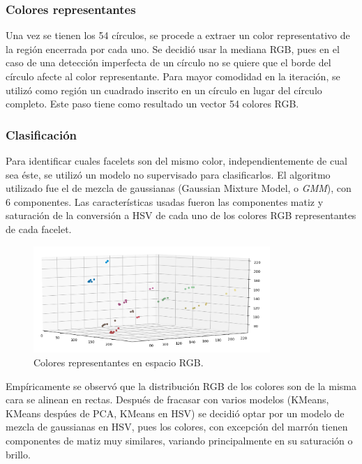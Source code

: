 \subsubsection{Colores representantes}
Una vez se tienen los 54 círculos, se procede a extraer un color representativo de la región encerrada por cada uno. Se decidió usar la mediana RGB, pues en el caso de una detección imperfecta de un círculo no se quiere que el borde del círculo afecte al color representante. Para mayor comodidad en la iteración, se utilizó como región un cuadrado inscrito en un círculo en lugar del círculo completo. Este paso tiene como resultado un vector 54 colores RGB.

\subsubsection{Clasificación}
Para identificar cuales facelets son del mismo color, independientemente de cual sea éste, se utilizó un modelo no supervisado para clasificarlos. El algoritmo utilizado fue el de mezcla de gaussianas (Gaussian Mixture Model, o \textit{GMM}), con 6 componentes. Las características usadas fueron las componentes matiz y saturación de la conversión a HSV de cada uno de los colores RGB representantes de cada facelet.

\begin{figure}[h!]
	\centering
	\includegraphics[width=0.8\textwidth]{figures/rgb_3d}
	\caption{Colores representantes en espacio RGB.}
	\label{rgb3d}
\end{figure}


Empíricamente se observó que la distribución RGB de los colores son de la misma cara se alinean en rectas. Después de fracasar con varios modelos (KMeans, KMeans despúes de PCA, KMeans en HSV) se decidió optar por un modelo de mezcla de gaussianas en HSV, pues los colores, con excepción del marrón tienen componentes de matiz muy similares, variando principalmente en su saturación o brillo.

